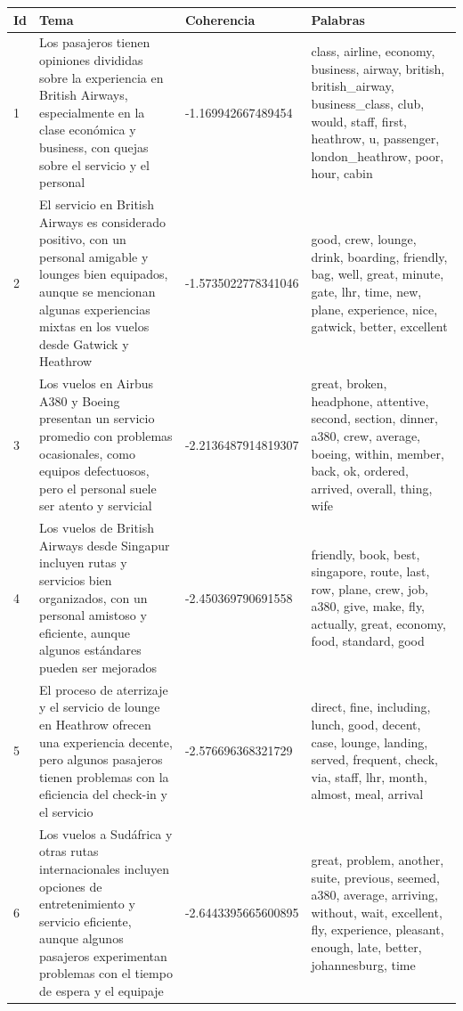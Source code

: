 \documentclass{report}
\begin{document}
                \begin{longtable}{|p{1cm}|p{4cm}|p{4cm}|p{6cm}|}
                    \hline
                    \textbf{Id} & \textbf{Tema} & \textbf{Coherencia} & \textbf{Palabras} \\
                    \hline
                    1 & Los pasajeros tienen opiniones divididas sobre la experiencia en British Airways, especialmente en la clase económica y business, con quejas sobre el servicio y el personal & -1.169942667489454 & class, airline, economy, business, airway, british, british\_airway, business\_class, club, would, staff, first, heathrow, u, passenger, london\_heathrow, poor, hour, cabin \\
                    \hline
                    2 & El servicio en British Airways es considerado positivo, con un personal amigable y lounges bien equipados, aunque se mencionan algunas experiencias mixtas en los vuelos desde Gatwick y Heathrow & -1.5735022778341046 & good, crew, lounge, drink, boarding, friendly, bag, well, great, minute, gate, lhr, time, new, plane, experience, nice, gatwick, better, excellent \\
                    \hline
                    3 & Los vuelos en Airbus A380 y Boeing presentan un servicio promedio con problemas ocasionales, como equipos defectuosos, pero el personal suele ser atento y servicial & -2.2136487914819307 & great, broken, headphone, attentive, second, section, dinner, a380, crew, average, boeing, within, member, back, ok, ordered, arrived, overall, thing, wife \\
                    \hline
                    4 & Los vuelos de British Airways desde Singapur incluyen rutas y servicios bien organizados, con un personal amistoso y eficiente, aunque algunos estándares pueden ser mejorados & -2.450369790691558 & friendly, book, best, singapore, route, last, row, plane, crew, job, a380, give, make, fly, actually, great, economy, food, standard, good \\
                    \hline
                    5 & El proceso de aterrizaje y el servicio de lounge en Heathrow ofrecen una experiencia decente, pero algunos pasajeros tienen problemas con la eficiencia del check-in y el servicio & -2.576696368321729 & direct, fine, including, lunch, good, decent, case, lounge, landing, served, frequent, check, via, staff, lhr, month, almost, meal, arrival \\
                    \hline
                    6 & Los vuelos a Sudáfrica y otras rutas internacionales incluyen opciones de entretenimiento y servicio eficiente, aunque algunos pasajeros experimentan problemas con el tiempo de espera y el equipaje & -2.6443395665600895 & great, problem, another, suite, previous, seemed, a380, average, arriving, without, wait, excellent, fly, experience, pleasant, enough, late, better, johannesburg, time \\

\end{longtable}
\end{document}
